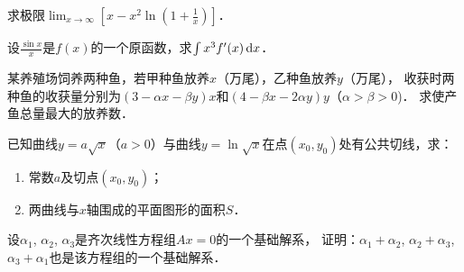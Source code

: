 \documentclass[plain,noanswer,medmath]{../../template/jnuexam}
\begin{document}



\begin{problem}
求极限$\lim_{x \to \infty} \left[x - x^2\ln \left(1 + \frac{1}{x} \right) \right]$．
\end{problem}



%



\begin{problem}
设$\frac{\sin x}{x}$是$f(x)$的一个原函数，求$\int x^3 f'(x)\mathop{}\!\mathrm{d} x$．
\end{problem}



\begin{problem}
某养殖场饲养两种鱼，若甲种鱼放养$x$（万尾），乙种鱼放养$y$（万尾），
收获时两种鱼的收获量分别为$(3 - \alpha x - \beta y)x$和$(4 - \beta x - 2\alpha y)y$（$\alpha > \beta > 0$)．
求使产鱼总量最大的放养数．
\end{problem}



\begin{problem}
已知曲线$y = a\sqrt{x}$（$a > 0$）与曲线$y = \ln \sqrt{x}$在点$(x_0,y_0)$处有公共切线，求：
\begin{enumerate}
\item 常数$a$及切点$(x_0,y_0)$；
\item 两曲线与$x$轴围成的平面图形的面积$S$．
\end{enumerate}
\end{problem}



%




\begin{problem}
设$\alpha_1$, $\alpha_2$, $\alpha_3$是齐次线性方程组$Ax = 0$的一个基础解系，
证明：$\alpha_1 + \alpha_2$, $\alpha_2 + \alpha_3$, $\alpha_3 + \alpha_1$也是该方程组的一个基础解系．
\end{problem}
\end{document}
